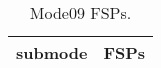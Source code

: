 \begin{table}[h!]
\begin{center}
\begin{tabular}{cl}
\hline
submode& FSPs\\
\hline
\hline
\end{tabular}
\label{tab:Mode09FSPs}
\caption{Mode09 FSPs.}
\end{center}
\end{table}
